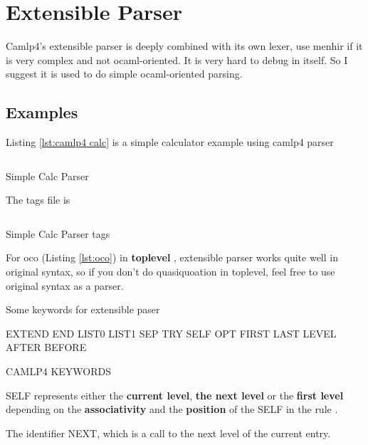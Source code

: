 \section{Extensible Parser}

Camlp4's extensible parser is deeply combined with its own lexer, use
menhir if it is very complex and not ocaml-oriented. It is very hard
to debug in itself. So I suggest it is used to do simple
ocaml-oriented parsing.

\subsection{Examples}
Listing \ref{lst:camlp4 calc}  is a simple calculator example using
camlp4 parser
\begin{listing}
\inputminted[fontsize=\scriptsize]{ocaml}{code/camlp4/arith/first.ml}
\caption{Simple Calc Parser}
\label{lst:camlp4 calc}
\end{listing}

The tags file is 
\begin{listing}
  \inputminted[fontsize=\scriptsize]{bash}{code/camlp4/arith/_tags}
  \caption{Simple Calc Parser tags}
\end{listing}


For oco (Listing \ref{lst:oco}) in \textbf{ toplevel }, extensible parser works quite
  well in original syntax, so  if you don't do quasiquoation in
toplevel, feel free to use original syntax as a parser.  

Some keywords for extensible paser
\begin{listing}
  \begin{ocamlcode}
    EXTEND END  LIST0 LIST1 SEP TRY SELF OPT  FIRST LAST  LEVEL AFTER BEFORE
  \end{ocamlcode}
  \caption{CAMLP4 KEYWORDS}
  \label{lst:camlp4 keywords}
\end{listing}

SELF represents either the \textbf{current level}, \textbf{the next
  level} or the \textbf{ first level} depending on the \textbf{
  associativity} and the \textbf{position} of the SELF in the rule .

The identifier NEXT, which is a call to the next level of the current
entry.

